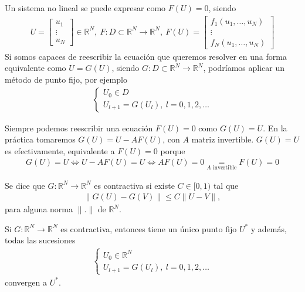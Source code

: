 \noindent Un sistema no lineal se puede expresar como $F(U) = 0$, siendo
\begin{align*}
    U = \begin{bmatrix}
u_1\\
\vdots\\
u_N
\end{bmatrix} \in \mathbb{R}^N, \ F : D \subset \mathbb{R}^N \longrightarrow \mathbb{R}^N, \ F(U) = \begin{bmatrix}
f_1(u_1,\ldots,u_N)\\
\vdots\\
f_N(u_1,\ldots,u_N)
\end{bmatrix}
\end{align*}
Si somos capaces de reescribir la ecuación que queremos resolver en una forma equivalente como $U = G(U)$, siendo $G: D \subset \mathbb{R}^N \longrightarrow \mathbb{R}^N$, podríamos aplicar un método de punto fijo, por ejemplo
\begin{align*}
            \left\{ \begin{array}{lcc}
             U_0 \in D\\
             U_{l+1} = G(U_l), \ l = 0,1,2,\ldots
             \end{array}
   \right.
\end{align*}

\begin{obs}
Siempre podemos reescribir una ecuación $F(U) = 0$ como $G(U) = U$. En la práctica tomaremos $G(U) = U -AF(U)$, con $A$ matriz invertible. $G(U) = U$ es efectivamente, equivalente a $F(U) = 0$ porque
\begin{align*}
    G(U) = U \Longleftrightarrow U - AF(U) = U \Longleftrightarrow AF(U) = 0 \underset{A \text{ invertible}}{=} F(U) = 0
\end{align*}
\end{obs}

\begin{defi}
Se dice que $G: \mathbb{R}^N \longrightarrow \mathbb{R}^N$ es contractiva si existe $C \in [0,1)$ tal que
\begin{align*}
    \| G(U) - G(V) \| \leq C \| U - V \| ,
\end{align*}
para alguna norma $\|.\|$ de $\mathbb{R}^N$.
\end{defi}

\begin{teo}
Si $G: \mathbb{R}^N \longrightarrow \mathbb{R}^N$ es contractiva, entonces tiene un único punto fijo $U^*$ y además, todas las sucesiones
\begin{align*}
            \left\{ \begin{array}{lcc}
             U_0 \in \mathbb{R}^N\\
             U_{l+1} = G(U_l), \ l = 0,1,2,\ldots
             \end{array}
   \right.
\end{align*}
convergen a $U^*$.
\end{teo}

